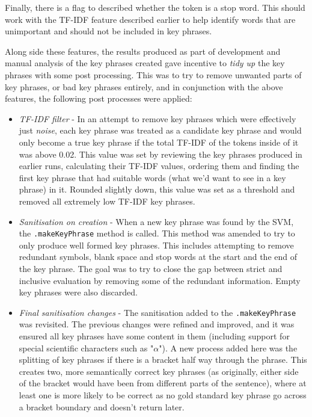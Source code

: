 Finally, there is a flag to described whether the token is a stop word. This should work with the TF-IDF feature described earlier to help identify words that are unimportant and should not be included in key phrases.

Along side these features, the results produced as part of development and manual analysis of the key phrases created gave incentive to \textit{tidy up} the key phrases with some post processing. This was to try to remove unwanted parts of key phrases, or bad key phrases entirely, and in conjunction with the above features, the following post processes were applied:

\begin{itemize}
	\item \textit{TF-IDF filter} - In an attempt to remove key phrases which were effectively just \textit{noise}, each key phrase was treated as a candidate key phrase and would only become a true key phrase if the total TF-IDF of the tokens inside of it was above 0.02. This value was set by reviewing the key phrases produced in earlier runs, calculating their TF-IDF values, ordering them and finding the first key phrase that had suitable words (what we'd want to see in a key phrase) in it. Rounded slightly down, this value was set as a threshold and removed all extremely low TF-IDF key phrases.
	\item \textit{Sanitisation on creation} - When a new key phrase was found by the SVM, the \texttt{.makeKeyPhrase} method is called. This method was amended to try to only produce well formed key phrases. This includes attempting to remove redundant symbols, blank space and stop words at the start and the end of the key phrase. The goal was to try to close the gap between strict and inclusive evaluation by removing some of the redundant information. Empty key phrases were also discarded.
	\item \textit{Final sanitisation changes} - The sanitisation added to the \texttt{.makeKeyPhrase} was revisited. The previous changes were refined and improved, and it was ensured all key phrases have some content in them (including support for special scientific characters such as "$\alpha$"). A new process added here was the splitting of key phrases if there is a bracket half way through the phrase. This creates two, more semantically correct key phrases (as originally, either side of the bracket would have been from different parts of the sentence), where at least one is more likely to be correct as no gold standard key phrase go across a bracket boundary and doesn't return later. 
\end{itemize}

